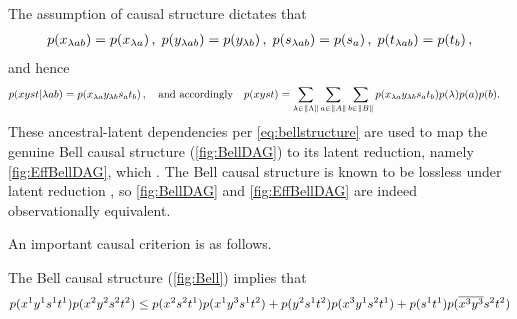 The assumption of causal structure dictates that
\begin{align}\begin{split}\label{eq:bellstructure}
\p{x_{\lambda a b}}=\p{x_{\lambda a}} \,,\; \p{y_{\lambda a b}}=\p{y_{\lambda b}} \,,\; \p{s_{\lambda a b}}=\p{s_{a}} \,,\; \p{t_{\lambda a b}}=\p{t_{b}} \,,%
\end{split}\end{align}
and hence
\begin{align}\begin{split}\label{eq:bellintegration}
&p\lparen x y s t | \lambda a b\rparen=p\lparen x_{\lambda a} y_{\lambda b} s_a t_b\rparen\,,\quad\text{and accordingly}\quad p\lparen x y s t\rparen=\sum\limits_{{\lambda\in \lVert\Lambda\rVert}}\sum\limits_{{a\in \lVert A\rVert}}\sum\limits_{{b\in \lVert B\rVert}}p\lparen x_{\lambda a} y_{\lambda b} s_a t_b\rparen p\lparen\lambda\rparen p\lparen a\rparen p\lparen b\rparen.
\end{split}\end{align}
These ancestral-latent dependencies per \cref{eq:bellstructure} are used to map the genuine Bell causal structure (\cref{fig:BellDAG}) to its latent reduction, namely \cref{fig:EffBellDAG}, which . The Bell causal structure is known to be lossless under latent reduction \citep[Thm.~2.4]{fritz2012bell}, so \cref{fig:BellDAG} and \cref{fig:EffBellDAG} are indeed observationally equivalent.

An important causal criterion is as follows. 
\begin{prop} \label{prop:CH}
The Bell causal structure (\cref{fig:Bell}) implies that
\begin{align*}
p\lparen x^1 y^1 s^1 t^1\rparen p\lparen x^2 y^2 s^2 t^2\rparen
\leq
p\lparen x^2 s^2 t^1\rparen p\lparen x^1 y^3 s^1 t^2\rparen
+p\lparen y^2 s^1 t^2\rparen p\lparen x^3 y^1 s^2 t^1\rparen
+p\lparen s^1 t^1\rparen p\lparen\overline{x^3} \overline{y^3} s^2 t^2\rparen
\end{align*}
\end{prop}

